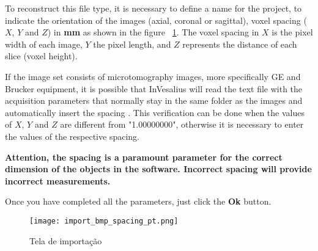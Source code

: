 To reconstruct this file type, it is necessary to define a name for the project, to indicate the orientation of the images (axial, coronal or sagittal), voxel spacing ($X$, $Y$ and $Z$) in \textbf{mm} as shown in the figure ~\ref{fig:import_bmp_spacing_pt}. The voxel spacing in $X$ is the pixel width of each image, $Y$ the pixel length, and $Z$ represents the distance of each slice (voxel height).


If the image set consists of microtomography images, more specifically GE and Brucker equipment, it is possible that InVesalius will read the text file with the acquisition parameters that normally stay in the same folder as the images and automatically insert the spacing . This verification can be done when the values of $X$, $Y$ and $Z$ are different from "1.00000000", otherwise it is necessary to enter the values of the respective spacing.


\textbf{Attention, the spacing is a paramount parameter for the correct dimension of the objects in the software. Incorrect spacing will provide incorrect measurements.}

Once you have completed all the parameters, just click the \textbf{Ok} button.


\begin{figure}[!htb]
\centering
\texttt{[image: import\_bmp\_spacing\_pt.png]}
\caption{Tela de importação}
\label{fig:import_bmp_spacing_pt}
\end{figure}


